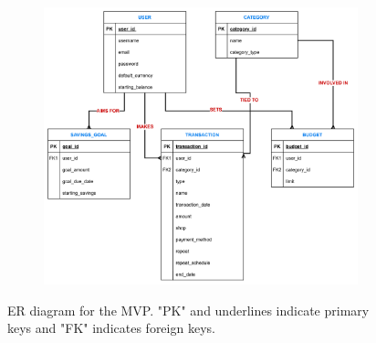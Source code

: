 \documentclass{l4proj}
\begin{document}
\begin{figure}[htb] 
    \centering
    \begin{subfigure}[b]{0.75\textwidth}
        \includegraphics[width=\textwidth]{images/ER-Diagrams/final_MVP_ER.png}
        \label{fig:syn1}
    \end{subfigure}   
    \caption{ER diagram for the MVP. "PK" and underlines indicate primary keys and "FK" indicates foreign keys.}\label{fig:mvp-database}
\end{figure}
\end{document}
